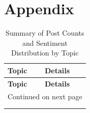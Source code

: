 \onecolumn
\section*{Appendix}\label{s:artifact-appendix}


\begin{longtable}{|p{6cm}|p{10cm}|}
\hline
\textbf{Topic} & \textbf{Details} \\
\hline
\endfirsthead


\hline
\textbf{Topic} & \textbf{Details} \\
\hline
\endhead


\hline \multicolumn{2}{|r|}{{Continued on next page}} \\ \hline
\endfoot

\hline
\caption{Summary of Post Counts and Sentiment Distribution by Topic} \label{tab:topic-summary} \\
\endlastfoot


\end{longtable}
